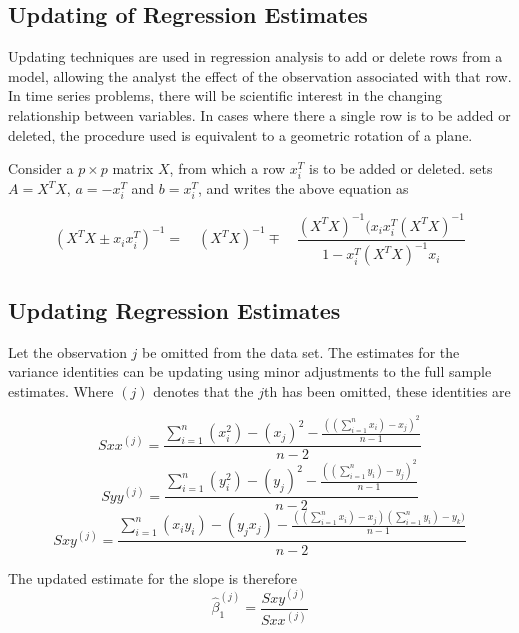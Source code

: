 \subsection{Updating of Regression Estimates}
Updating techniques are used in regression analysis to add or
delete rows from a model, allowing the analyst the effect of the
observation associated with that row. In time series problems,
there will be scientific interest in the changing relationship
between variables. In cases where there a single row is to be
added or deleted, the procedure used is equivalent to a geometric
rotation of a plane.

Consider a $p \times p$ matrix $X$, from which a row $x_{i}^{T}$
is to be added or deleted. \citet{CookWeisberg} sets $A = X^{T}X$,
$a=-x_{i}^{T}$ and $b=x_{i}^{T}$, and writes the above equation as

\begin{equation}
(X^{T}X \pm x_{i}x_{i}^{T})^{-1} = \quad(X^{T}X )^{-1} \mp \quad
\frac{(X^{T}X)^{-1}(x_{i}x_{i}^{T}(X^{T}X)^{-1}}{1-x_{i}^{T}(X^{T}X)^{-1}x_{i}}
\end{equation}

\subsection{Updating Regression Estimates}
Let the observation $j$ be omitted from the data set. The estimates for the variance identities can be updating using minor adjustments to the full sample estimates. Where $(j)$ denotes that the $j$th has been omitted, these identities are

\begin{equation}
Sxx^{(j)}=\frac{\sum_{i=1}^{n}(x_{i}^{2})-(x_{j})^{2}-\frac{((\sum_{i=1}^{n}x_{i})-x_{j})^{2}}{n-1}}{n-2}
\end{equation}
\begin{equation}
Syy^{(j)}=\frac{\sum_{i=1}^{n}(y_{i}^{2})-(y_{j})^{2}-\frac{((\sum_{i=1}^{n}y_{i})-y_{j})^{2}}{n-1}}{n-2}
\end{equation}
\begin{equation}
Sxy^{(j)}=\frac{\sum_{i=1}^{n}(x_{i}y_{i})-(y_{j}x_{j})-\frac{((\sum_{i=1}^{n}x_{i})-x_{j})(\sum_{i=1}^{n}y_{i})-y_{k})}{n-1}}{n-2}
\end{equation}

The updated estimate for the slope is therefore
\begin{equation}
\hat{\beta}_{1}^{(j)}=\frac{Sxy^{(j)}}{Sxx^{(j)}}
\end{equation}

